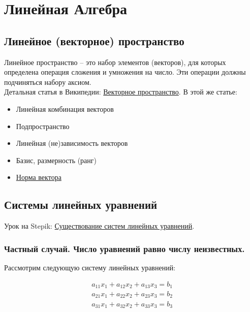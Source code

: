 \documentclass{article}
\begin{document}
\section{Линейная Алгебра}

\subsection{Линейное (векторное) пространство}

Линейное пространство -- это набор элементов (векторов), для которых определена операция сложения и умножения на число. Эти операции должны подчиняться набору аксиом. \\

Детальная статья в Википедии: \href{https://ru.wikipedia.org/wiki/%D0%92%D0%B5%D0%BA%D1%82%D0%BE%D1%80%D0%BD%D0%BE%D0%B5_%D0%BF%D1%80%D0%BE%D1%81%D1%82%D1%80%D0%B0%D0%BD%D1%81%D1%82%D0%B2%D0%BE}{Векторное пространство}. В этой же статье:
\begin{itemize}
	\item Линейная комбинация векторов
	\item Подпространство
	\item Линейная (не)зависимость векторов
	\item Базис, размерность (ранг)
	\item \href{https://ru.wikipedia.org/wiki/%D0%9D%D0%BE%D1%80%D0%BC%D0%B0_(%D0%BC%D0%B0%D1%82%D0%B5%D0%BC%D0%B0%D1%82%D0%B8%D0%BA%D0%B0)}{Норма вектора}
\end{itemize}

\subsection{Системы линейных уравнений}

Урок на Stepik: \href{https://stepik.org/course/2461/syllabus}{Существование систем линейных уравнений}. \\

\subsubsection{Частный случай. Число уравнений равно числу неизвестных.}

Рассмотрим следующую систему линейных уравнений:

\[ \begin{array}{c}
	a_{11} x_{1} + a_{12} x_2 + a_{13} x_3 = b_1 \\
	a_{21} x_{1} + a_{22} x_2 + a_{23} x_3 = b_2 \\
	a_{31} x_{1} + a_{32} x_2 + a_{33} x_3 = b_3 \\
\end{array} \]
\end{document}

